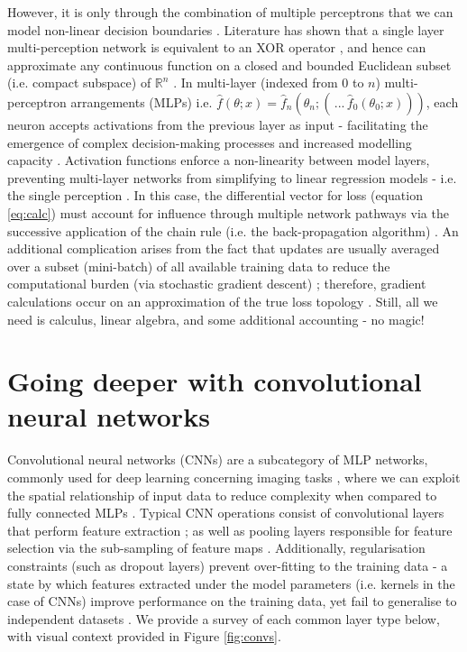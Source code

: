 However, it is only through the combination of multiple perceptrons that we can model non-linear decision boundaries \cite{Maier2019}. Literature has shown that a single layer multi-perception network is equivalent to an XOR operator \cite{Yanling}, and hence can approximate any continuous function on a closed and bounded Euclidean subset (i.e. compact subspace) of $\mathbb{R}^{n}$ \cite{Cybenko1989}. In multi-layer (indexed from $0$ to $n$) multi-perceptron arrangements (MLPs) i.e. $\hat{f}(\theta; x)= \hat{f}_{n}(\theta_{n};(\,... \,\hat{f}_{0}(\theta_{0}; x)))$, each neuron accepts activations from the previous layer as input - facilitating the emergence of complex decision-making processes and increased modelling capacity \cite{Maier2019}. Activation functions enforce a non-linearity between model layers, preventing multi-layer networks from simplifying to linear regression models - i.e. the single perception \cite{Aggarwal2018}.  In this case, the differential vector for loss (equation \ref{eq:calc}) must account for influence through multiple network pathways via the successive application of the chain rule (i.e. the back-propagation algorithm) \cite{Maier2019}. An additional complication arises from the fact that updates are usually averaged over a subset (mini-batch) of all available training data to reduce the computational burden (via stochastic gradient descent) \cite{Sun2019}; therefore, gradient calculations occur on an approximation of the true loss topology \cite{Sun2019}. Still, all we need is calculus, linear algebra, and some additional accounting - no magic!


\section{Going deeper with convolutional neural networks}
Convolutional neural networks (CNNs) are a subcategory of MLP networks, commonly used for deep learning concerning imaging tasks \cite{Maier2019}, where we can exploit the spatial relationship of input data to reduce complexity when compared to fully connected MLPs \cite{Lundervold2019}. Typical CNN operations consist of convolutional layers that perform feature extraction \cite{Hesamian2019}; as well as pooling layers responsible for feature selection via the sub-sampling of feature maps \cite{Ronneberger_2015}. Additionally, regularisation constraints (such as dropout layers) prevent over-fitting to the training data - a state by which features extracted under the model parameters (i.e. kernels in the case of CNNs) improve performance on the training data, yet fail to generalise to independent datasets \cite{Lundervold2019}. We provide a survey of each common layer type below, with visual context provided in Figure \ref{fig:convs}.

